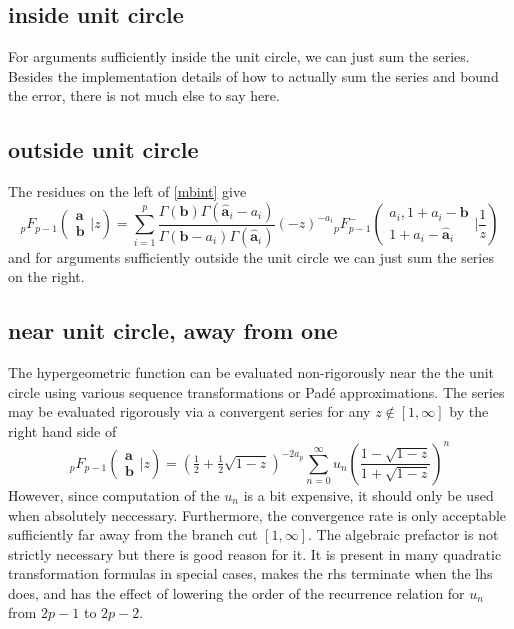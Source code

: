 \documentclass[12pt]{article}
\numberwithin{equation}{section}
\newcommand{\FF}[6] {{}_{#1}{#2}_{#3} \left( \begin{array}{c} #4 \\ #5 \end{array} \Big| {#6}  \right)}
\newcommand{\FFe}[7] {{}_{#1}^{\,}{#2}_{#3}^{#4} \left( \begin{array}{c} #5 \\ #6 \end{array} \Big| {#7} \right)}
\begin{document}
\subsection{inside unit circle}
For arguments sufficiently inside the unit circle, we can just sum the series. Besides the implementation details of how to actually sum the series and bound the error, there is not much else to say here.

\subsection{outside unit circle}
The residues on the left of \eqref{mbint} give
\begin{equation}
\label{balanced_outside}
\FF{p}{F}{p-1}{\mathbf{a}}{\mathbf{b}}{z} = \sum_{i=1}^{p} \frac{\Gamma(\mathbf{b}) \Gamma(\hat{\mathbf{a}}_i-a_i)}{\Gamma(\mathbf{b}-a_i) \Gamma(\hat{\mathbf{a}}_i)} (-z)^{-a_i} \FFe{p}{F}{p-1}{-}{a_i,1+a_i-\mathbf{b}}{1+a_i-\hat{\mathbf{a}}_i}{\frac{1}{z}}
\end{equation}
and for arguments sufficiently outside the unit circle we can just sum the series on the right.

\subsection{near unit circle, away from one}
The hypergeometric function can be evaluated non-rigorously near the the unit circle using various sequence transformations or Pad\'e approximations. The series may be evaluated rigorously via a convergent series for any $z \not \in [1,\infty]$ by the right hand side of
\begin{equation}
\label{balanced_anywhere}
\FF{p}{F}{p-1}{\mathbf{a}}{\mathbf{b}}{z} = (\tfrac12+ \tfrac12 \sqrt{1-z})^{-2 a_p} \sum_{n=0}^{\infty}u_n \left(\frac{1-\sqrt{1-z}}{1+\sqrt{1-z}}\right)^n
\end{equation}
However, since computation of the $u_n$ is a bit expensive, it should only be used when absolutely neccessary. Furthermore, the convergence rate is only acceptable sufficiently far away from the branch cut $[1,\infty]$. The algebraic prefactor is not strictly necessary but there is good reason for it. It is present in many quadratic transformation formulas in special cases, makes the rhs terminate when the lhs does, and has the effect of lowering the order of the recurrence relation for $u_n$ from $2p-1$ to $2p-2$.
\end{document}
